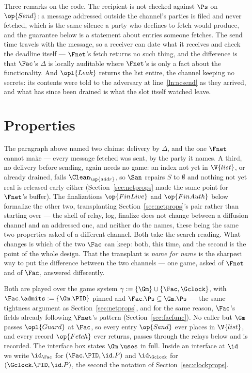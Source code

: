 \documentclass[10pt,oneside,openany]{book}
\theoremstyle{accentdef}
\theoremstyle{accentplain}
\begin{document}


Three remarks on the code. The recipient is not checked against $\Ps$ on $\op{Send}$: a message
addressed outside the channel's parties is filed and never fetched, which is the same silence a
party who declines to fetch would produce, and the guarantee below is a statement about entries
someone fetches. The send time travels with the message, so a receiver can date what it receives
and check the deadline itself --- $\Fnet$'s fetch returns no such thing, and the difference is
that $\Fac$'s $\Delta$ is locally auditable where $\Fnet$'s is only a fact about the
functionality. And $\opl{Leak}$ returns the list entire, the channel keeping no secrets: its
contents were told to the adversary at line~\ref{ln:acsend} as they arrived, and what has since
been drained is what the slot itself watched leave.

\section{Properties}\label{sec:facprops}

The paragraph above named two claims: delivery by $\Delta$, and the one $\Fnet$ cannot make ---
every message fetched was sent, by the party it names. A third, no delivery before sending, again
needs no game: an index not yet in $\V{list}$, or already drained, fails $\Clean_{\op{addr}}$, so
$\San$ repairs $S$ to $\emptyset$ and nothing not yet real is released early either
(Section~\ref{sec:netprops} made the same point for $\Fnet$'s buffer). The finalizations $\op{FinLive}$ and
$\op{FinAuth}$ below formalize the other two, transplanting Section~\ref{sec:netprops}'s pair
rather than starting over --- the shell of relay, log, finalize does not change between a diffusion
channel and an addressed one, and neither do the names, these being the same two properties asked
of a different channel. Both take the search reading. What changes is which of the two $\Fac$ can
keep: both, this time, and the second is the point of the whole design. That the transplant is
\emph{name for name} is the sharpest way to put the difference between the two channels --- one
game, asked of $\Fnet$ and of $\Fac$, answered differently.

Both are played over the game system $\gamma := \{\Gm\} \cup \{\Fac,\Gclock\}$, with
$\Fac.\admits := \{\Gm.\PID\}$ pinned and $\Fac.\Ps \subseteq \Gm.\Ps$ --- the same tightness
argument as Section~\ref{sec:netprops}, and for the same reason, $\Fac$'s fields already
following $\Fnet$'s pattern (Section~\ref{sec:facfunc}). No caller but $\Gm$ passes $\opl{Guard}$
at $\Fac$, so every entry $\op{Send}$ ever places in $\V{list}$, and every record $\op{Fetch}$
ever returns, passes through the relays below and is recorded. The interface box states
$\Gm.\uses$ in full. Inside an interface at $\id$ we write $\id_{\Fac}$ for $(\Fac.\PID,\id.P)$
and $\id_{\Gclock}$ for $(\Gclock.\PID,\id.P)$, the second the notation of
Section~\ref{sec:clockprops}.
\end{document}
